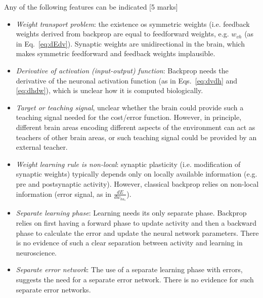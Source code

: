 \documentclass{article}
\begin{document}
\begin{enumerate}
\begin{enumerate}
Any of the following features can be indicated [5 marks]\\
\begin{itemize}
\item \textit{Weight transport problem}: the existence os symmetric weights (i.e. feedback weights derived from backprop are equal to feedforward weights, e.g. $w_{vh}$ (as in Eq.~\ref{eq:dEdv}). Synaptic weights are unidirectional in the brain, which makes symmetric feedforward and feedback weights implausible.\\

\item \textit{Derivative of activation (input-output) function}: Backprop needs the derivative of the neuronal activation function (as in Eqs.~\ref{eq:dvdh} and \ref{eq:dhdw}), which is unclear how it is computed biologically.\\

\item \textit{Target or teaching signal}, unclear whether the brain could provide such a teaching signal needed for the cost/error function. However, in principle, different brain areas encoding different aspects of the environment can act as teachers of other brain areas, or such teaching signal could be provided by an external teacher.\\

\item \textit{Weight learning rule is non-local}: synaptic plasticity (i.e. modification of synaptic weights) typically depends only on locally available information (e.g. pre and postsynaptic activity). However, classical backprop relies on non-local information (error signal, as in $\frac{d E}{d w_{hu_1}}$).\\

\item \textit{Separate learning phase}: Learning needs its only separate phase. Backprop relies on first having a forward phase to update activity and then a backward phase to calculate the error and update the neural network parameters. There is no evidence of such a clear separation between activity and learning in neuroscience.\\

\item \textit{Separate error network}: The use of a separate learning phase with errors, suggests the need for a separate error network. There is no evidence for such separate error networks.\\
\end{itemize}
  \fi



\end{enumerate}
\end{enumerate}
\end{document}
